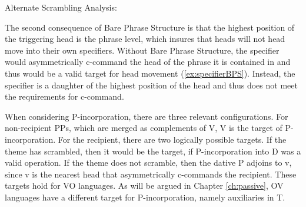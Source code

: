 \begin{exe}
	\ex Alternate Scrambling Analysis:\label{ex:Scramp-tree}\\
 \end{exe} 

 The second consequence of Bare Phrase Structure is that the highest position of the triggering head is the phrase level, which insures that heads will not head move into their own specifiers. Without Bare Phrase Structure, the specifier would asymmetrically c-command the head of the phrase it is contained in and thus would be a valid target for head movement (\ref{ex:specifierBPS}). Instead, the specifier is a daughter of the highest position of the head and thus does not meet the requirements for c-command.

 \begin{exe}
	\ex {} \label{ex:specifierBPS}
 \end{exe}
 
 When considering P-incorporation, there are three relevant configurations. For non-recipient PPs, which are merged as complements of V, V is the target of P-incorporation. For the recipient, there are two logically possible targets. If the theme has scrambled, then it would be the target, if P-incorporation into D was a valid operation. If the theme does not scramble, then the dative P adjoins to v, since v is the nearest head that asymmetrically c-commands the recipient. These targets hold for VO languages. As will be argued in Chapter \ref{ch:passive}, OV languages have a different target for P-incorporation, namely auxiliaries in T.

